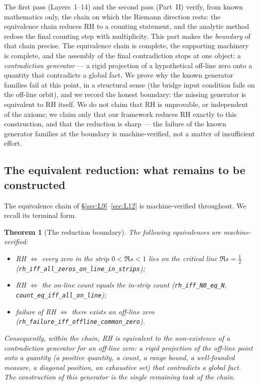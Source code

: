 \documentclass{article}
\newtheorem{theorem}{Theorem}[section]
\begin{document}
The first pass (Layers~1--14) and the second pass (Part~II) verify,
from known mathematics only, the chain on which the Riemann direction
rests: the equivalence chain reduces RH to a counting statement, and the
analytic method redoes the final counting step with multiplicity. This
part makes the \emph{boundary} of that chain precise. The equivalence
chain is complete, the supporting machinery is complete, and the
assembly of the final contradiction stops at one object: a
\emph{contradiction generator} --- a rigid projection of a hypothetical
off-line zero onto a quantity that contradicts a global fact. We prove
why the known generator families fail at this point, in a structural
sense (the bridge input condition fails on the off-line orbit), and we
record the honest boundary: the missing generator is equivalent to RH
itself. We do not claim that RH is unprovable, or independent of the
axioms; we claim only that our framework reduces RH exactly to this
construction, and that the reduction is sharp --- the failure of the
known generator families at the boundary is machine-verified, not a
matter of insufficient effort.

\subsection{The equivalent reduction: what remains to be constructed}
\label{sec:partIII:eq}

The equivalence chain of \S\ref{sec:L9}--\ref{sec:L12} is machine-verified
throughout. We recall its terminal form.

\begin{theorem}[The reduction boundary]
\label{thm:reduction_boundary}
The following equivalences are machine-verified:
\begin{itemize}
\item RH $\iff$ every zero in the strip $0<\Re s<1$ lies on the critical
  line $\Re s=\tfrac12$
  (\texttt{rh\_iff\_all\_zeros\_on\_line\_in\_strips});
\item RH $\iff$ the on-line count equals the in-strip count
  (\texttt{rh\_iff\_N0\_eq\_N}, \texttt{count\_eq\_iff\_all\_on\_line});
\item failure of RH $\iff$ there exists an off-line zero
  (\texttt{rh\_failure\_iff\_offline\_common\_zero}).
\end{itemize}
Consequently, within the chain, RH is equivalent to the non-existence of
a contradiction generator for an off-line zero: a rigid projection of the
off-line point onto a quantity (a positive quantity, a count, a range
bound, a well-founded measure, a diagonal position, an exhaustive set)
that contradicts a global fact. \emph{The construction of this generator
is the single remaining task of the chain.}
\end{theorem}
\end{document}
